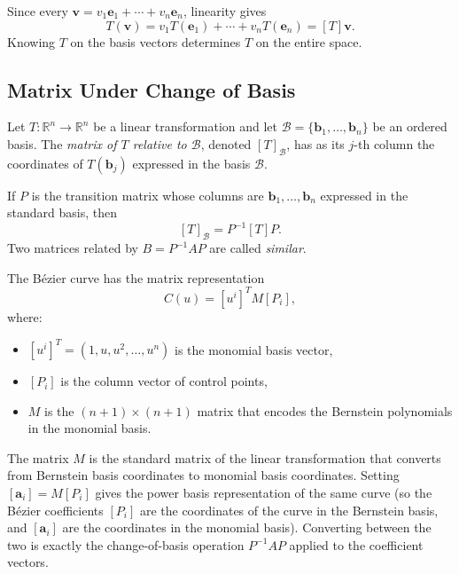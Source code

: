 \begin{remark*}
Since every $\mathbf{v} = v_1\mathbf{e}_1 + \cdots + v_n\mathbf{e}_n$,
linearity gives
\[
  T(\mathbf{v}) = v_1 T(\mathbf{e}_1) + \cdots + v_n T(\mathbf{e}_n) = [T]\mathbf{v}.
\]
Knowing $T$ on the basis vectors determines $T$ on the entire space.
\end{remark*}

\subsection{Matrix Under Change of Basis}

\begin{tcolorbox}[colback=propbox, colframe=propborder, arc=2pt,
  left=6pt, right=6pt, top=4pt, bottom=4pt,
  title={\small\textbf{Definition (Matrix Relative to a Basis)}},
  fonttitle=\small\bfseries]
Let $T : \mathbb{R}^n \to \mathbb{R}^n$ be a linear transformation and let
$\mathcal{B} = \{\mathbf{b}_1, \ldots, \mathbf{b}_n\}$ be an ordered basis.
The \emph{matrix of $T$ relative to $\mathcal{B}$}, denoted $[T]_\mathcal{B}$,
has as its $j$-th column the coordinates of $T(\mathbf{b}_j)$ expressed in the
basis $\mathcal{B}$.

If $P$ is the transition matrix whose columns are $\mathbf{b}_1, \ldots, \mathbf{b}_n$
expressed in the standard basis, then
\[
  [T]_\mathcal{B} = P^{-1} [T] P.
\]
Two matrices related by $B = P^{-1}AP$ are called \emph{similar}.
\end{tcolorbox}

\begin{remark*}
The Bézier curve has the matrix representation
\[
  C(u) = [u^i]^T M [P_i],
\]
where:
\begin{itemize}
  \item $[u^i]^T = (1, u, u^2, \ldots, u^n)$ is the monomial basis vector,
  \item $[P_i]$ is the column vector of control points,
  \item $M$ is the $(n+1)\times(n+1)$ matrix that encodes the Bernstein polynomials
        in the monomial basis.
\end{itemize}
The matrix $M$ is the standard matrix of the linear transformation
that converts from Bernstein basis coordinates to monomial basis coordinates.
Setting $[\mathbf{a}_i] = M[P_i]$ gives the power basis representation of the
same curve (so the Bézier coefficients $[P_i]$ are the coordinates of the
curve in the Bernstein basis, and $[\mathbf{a}_i]$ are the coordinates in the
monomial basis).
Converting between the two is exactly the change-of-basis operation $P^{-1}AP$
applied to the coefficient vectors.
\end{remark*}

